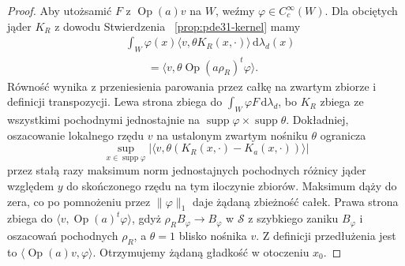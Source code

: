 \begin{proof}
Aby utożsamić $F$ z $\operatorname{Op}(a)v$ na $W$,
weźmy $\varphi\in C_c^\infty(W)$.
Dla obciętych jąder $K_R$ z dowodu Stwierdzenia
~\ref{prop:pde31-kernel} mamy
\[
 \begin{aligned}
 &\int_W\varphi(x)\langle v,\theta K_R(x,\cdot)\rangle
 \,\mathrm d\lambda_d(x)\\
 &\qquad=\langle v,\theta\operatorname{Op}(a\rho_R)^t
 \varphi\rangle .
 \end{aligned}
\]
Równość wynika z przeniesienia parowania przez
całkę na zwartym zbiorze i definicji transpozycji.
Lewa strona zbiega do
$\int_W\varphi F\,\mathrm d\lambda_d$,
bo $K_R$ zbiega ze wszystkimi pochodnymi jednostajnie
na $\operatorname{supp}\varphi\times\operatorname{supp}\theta$.
Dokładniej, oszacowanie lokalnego rzędu $v$
na ustalonym zwartym nośniku $\theta$ ogranicza
\[
 \sup_{x\in\operatorname{supp}\varphi}
 |\langle v,\theta(K_R(x,\cdot)-K_a(x,\cdot))\rangle|
\]
przez stałą razy maksimum norm jednostajnych
pochodnych różnicy jąder względem $y$
do skończonego rzędu na tym iloczynie zbiorów.
Maksimum dąży do zera, co po pomnożeniu
przez $\|\varphi\|_1$ daje żądaną zbieżność całek.
Prawa strona zbiega do
$\langle v,\operatorname{Op}(a)^t\varphi\rangle$,
gdyż $\rho_R B_\varphi\to B_\varphi$ w $\mathcal S$
z szybkiego zaniku $B_\varphi$ i oszacowań
pochodnych $\rho_R$, a $\theta=1$ blisko nośnika $v$.
Z definicji przedłużenia jest to
$\langle\operatorname{Op}(a)v,\varphi\rangle$.
Otrzymujemy żądaną gładkość w otoczeniu $x_0$.
\end{proof}

